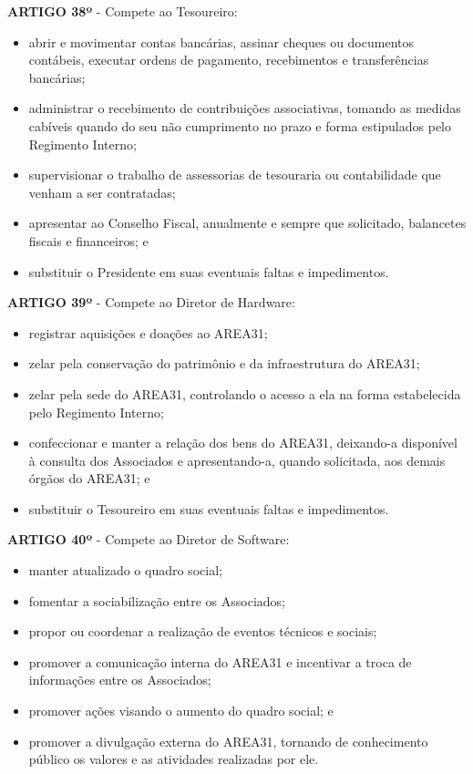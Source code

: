 \textbf{ARTIGO 38º} - Compete ao Tesoureiro:

\begin{itemize}
    \item abrir e movimentar contas bancárias, assinar cheques ou documentos contábeis, executar ordens de pagamento, recebimentos e transferências bancárias;
    \item administrar o recebimento de contribuições associativas, tomando as medidas cabíveis quando do seu não cumprimento no prazo e forma estipulados pelo Regimento Interno;
    \item supervisionar o trabalho de assessorias de tesouraria ou contabilidade que venham a ser contratadas;
    \item apresentar ao Conselho Fiscal, anualmente e sempre que solicitado, balancetes fiscais e financeiros; e
    \item substituir o Presidente em suas eventuais faltas e impedimentos.
\end{itemize}

\textbf{ARTIGO 39º} - Compete ao Diretor de Hardware:

\begin{itemize}
    \item registrar aquisições e doações ao AREA31;
    \item zelar pela conservação do patrimônio e da infraestrutura do AREA31;
    \item zelar pela sede do AREA31, controlando o acesso a ela na forma estabelecida pelo Regimento Interno;
    \item confeccionar e manter a relação dos bens do AREA31, deixando-a disponível à consulta dos Associados e apresentando-a, quando solicitada, aos demais órgãos do AREA31; e
    \item substituir o Tesoureiro em suas eventuais faltas e impedimentos.
\end{itemize}

\textbf{ARTIGO 40º} - Compete ao Diretor de Software:

\begin{itemize}
    \item manter atualizado o quadro social;
    \item fomentar a sociabilização entre os Associados;
    \item propor ou coordenar a realização de eventos técnicos e sociais;
    \item promover a comunicação interna do AREA31 e incentivar a troca de informações entre os Associados;
    \item promover ações visando o aumento do quadro social; e
    \item promover a divulgação externa do AREA31, tornando de conhecimento público os valores e as atividades realizadas por ele.
\end{itemize}
